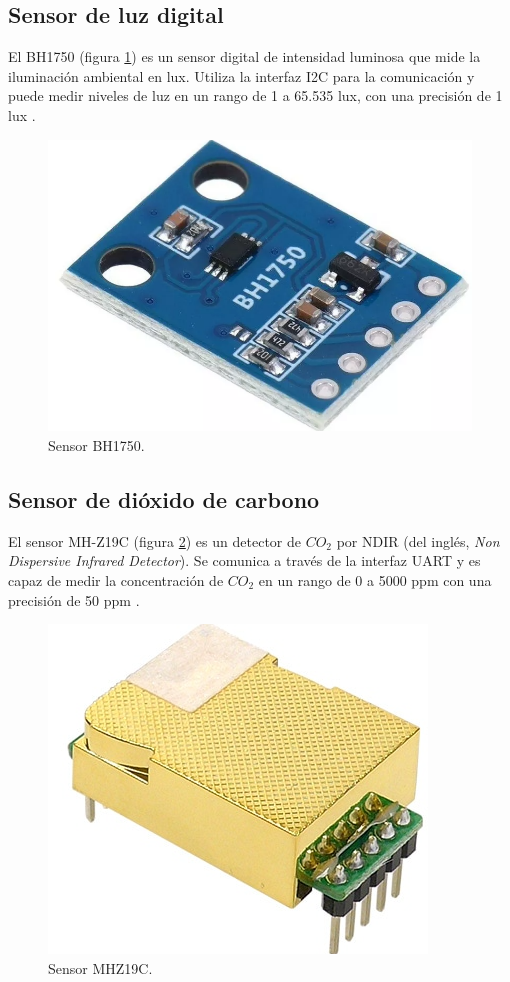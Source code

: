 
\subsection{Sensor de luz digital}\label{sec:BH1750}

El BH1750 (figura \ref{fig:BH1750}) es un sensor digital de intensidad luminosa
que mide la iluminación ambiental en lux. Utiliza la interfaz I2C para la
comunicación y puede medir niveles de luz en un rango de 1 a 65.535 lux, con
una precisión de 1 lux \cite{ROHM_BH1750}.

\begin{figure}[H]
	\centering
	\includegraphics[height=.15\textwidth]{./Images/5.png}
	\caption{Sensor BH1750\protect\footnotemark.}
	\label{fig:BH1750}
\end{figure}


\subsection{Sensor de dióxido de carbono}

El sensor MH-Z19C (figura \ref{fig:MHZ19C}) es un detector de $CO_2$ por NDIR
(del inglés, \textit{Non Dispersive Infrared Detector}). Se comunica a través
de la interfaz UART y es capaz de medir la concentración de $CO_2$ en un rango
de 0 a 5000 ppm con una precisión de 50 ppm \cite{WINSEN_MHZ19C}.

\begin{figure}[H]
	\centering
	\includegraphics[height=.15\textwidth]{./Images/6.png}
	\caption{Sensor MHZ19C\protect\footnotemark.}
	\label{fig:MHZ19C}
\end{figure}

